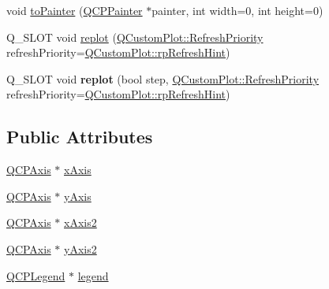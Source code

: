 \begin{DoxyCompactItemize}
void \hyperlink{class_q_custom_plot_a1be68d5c0f1e086d6374d1340a193fb9}{to\+Painter} (\hyperlink{class_q_c_p_painter}{Q\+C\+P\+Painter} $\ast$painter, int width=0, int height=0)
\item 
Q\+\_\+\+S\+L\+OT void \hyperlink{class_q_custom_plot_aa4bfe7d70dbe67e81d877819b75ab9af}{replot} (\hyperlink{class_q_custom_plot_a45d61392d13042e712a956d27762aa39}{Q\+Custom\+Plot\+::\+Refresh\+Priority} refresh\+Priority=\hyperlink{class_q_custom_plot_a45d61392d13042e712a956d27762aa39a49666a5854a68dbcca8b277b03331260}{Q\+Custom\+Plot\+::rp\+Refresh\+Hint})
\item 
\mbox{\label{class_q_custom_plot_a80d497a26045f9d352acd6b678d17e0f}} 
Q\+\_\+\+S\+L\+OT void {\bfseries replot} (bool step, \hyperlink{class_q_custom_plot_a45d61392d13042e712a956d27762aa39}{Q\+Custom\+Plot\+::\+Refresh\+Priority} refresh\+Priority=\hyperlink{class_q_custom_plot_a45d61392d13042e712a956d27762aa39a49666a5854a68dbcca8b277b03331260}{Q\+Custom\+Plot\+::rp\+Refresh\+Hint})
\end{DoxyCompactItemize}
\subsection*{Public Attributes}
\begin{DoxyCompactItemize}
\item 
\hyperlink{class_q_c_p_axis}{Q\+C\+P\+Axis} $\ast$ \hyperlink{class_q_custom_plot_a9a79cd0158a4c7f30cbc702f0fd800e4}{x\+Axis}
\item 
\hyperlink{class_q_c_p_axis}{Q\+C\+P\+Axis} $\ast$ \hyperlink{class_q_custom_plot_af6fea5679725b152c14facd920b19367}{y\+Axis}
\item 
\hyperlink{class_q_c_p_axis}{Q\+C\+P\+Axis} $\ast$ \hyperlink{class_q_custom_plot_ada41599f22cad901c030f3dcbdd82fd9}{x\+Axis2}
\item 
\hyperlink{class_q_c_p_axis}{Q\+C\+P\+Axis} $\ast$ \hyperlink{class_q_custom_plot_af13fdc5bce7d0fabd640f13ba805c0b7}{y\+Axis2}
\item 
\hyperlink{class_q_c_p_legend}{Q\+C\+P\+Legend} $\ast$ \hyperlink{class_q_custom_plot_a4eadcd237dc6a09938b68b16877fa6af}{legend}
\end{DoxyCompactItemize}
